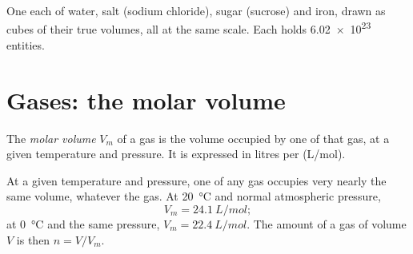\begin{omfigure}

{\small One  each of water, salt (sodium chloride), sugar (sucrose)
and iron, drawn as cubes of their true volumes, all at the same scale.
Each holds \num{6.02e23} entities.}
\end{omfigure}

\section{Gases: the molar volume}

\begin{definition}\label{def:g10:the-mole:molar-volume}
The \emph{molar volume} $V_m$ of a gas is the volume
occupied by one  of that gas, at a given temperature and pressure.
It is expressed in litres per  (\si{L/mol}).
\end{definition}

\begin{proposition}\label{prop:g10:the-mole:avogadro-law}
At a given temperature and pressure, one  of any gas occupies very
nearly the same volume, whatever the gas. At \qty{20}{\celsius} and
normal atmospheric pressure,
\[
  V_m = \qty{24.1}{L/mol};
\]
at \qty{0}{\celsius} and the same pressure, $V_m = \qty{22.4}{L/mol}$. The
amount of a gas of volume $V$ is then $n = V / V_m$.
\end{proposition}

